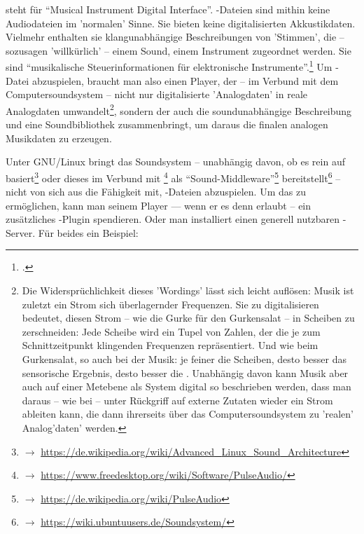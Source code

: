  steht für \enquote{Musical Instrument Digital Interface}.
-Dateien sind mithin keine Audiodateien im 'normalen' Sinne. Sie
bieten keine digitalisierten Akkustikdaten. Vielmehr enthalten sie
klangunabhängige Beschreibungen von 'Stimmen', die -- sozusagen 'willkürlich' --
einem Sound, einem Instrument zugeordnet werden. Sie sind \enquote{musikalische
Steuerinformationen für elektronische Instrumente}.\footcite[vgl. dazu][\nopage
wp]{WpedMidi2019a} Um -Datei abzuspielen, braucht man also einen
Player, der -- im Verbund mit dem Computersoundsystem -- nicht nur
digitalisierte 'Analogdaten' in reale Analogdaten umwandelt\footnote{Die
Widersprüchlichkeit dieses 'Wordings' lässt sich leicht auflösen:
Musik ist zuletzt ein Strom sich überlagernder Frequenzen. Sie zu digitalisieren
bedeutet, diesen Strom -- wie die Gurke für den Gurkensalat -- in Scheiben zu
zerschneiden: Jede Scheibe wird ein Tupel von Zahlen, der die je zum
Schnittzeitpunkt klingenden Frequenzen repräsentiert. Und wie beim Gurkensalat,
so auch bei der Musik: je feiner die Scheiben, desto besser das sensorische
Ergebnis, desto besser die . Unabhängig davon
kann Musik aber auch auf einer Metebene als System digital so beschrieben
werden, dass man daraus -- wie bei  -- unter Rückgriff auf externe
Zutaten wieder ein Strom  ableiten kann, die
dann ihrerseits über das Computersoundsystem zu 'realen' Analog'daten' werden.},
sondern der auch die soundunabhängige Beschreibung und eine Soundbibliothek
zusammenbringt, um daraus die finalen analogen Musikdaten zu erzeugen.

Unter GNU/Linux bringt das Soundsystem -- unabhängig davon, ob es rein auf
 basiert\footnote{$\rightarrow$
\href{https://de.wikipedia.org/wiki/Advanced{\_}Linux{\_}Sound{\_}Architecture}
{https://de.wikipedia.org/wiki/Advanced{\_}Linux{\_}Sound{\_}Architecture}} oder
dieses im Verbund mit \footnote{$\rightarrow$
\href{https://www.freedesktop.org/wiki/Software/PulseAudio/}
{https://www.freedesktop.org/wiki/Software/PulseAudio/}} als
\enquote{Sound-Middleware}\footnote{$\rightarrow$
\href{https://de.wikipedia.org/wiki/PulseAudio}
{https://de.wikipedia.org/wiki/PulseAudio}} bereitstellt\footnote{$\rightarrow$
\href{https://wiki.ubuntuusers.de/Soundsystem/}{https://wiki.ubuntuusers.de/Soundsystem/}}
-- nicht von sich aus die Fähigkeit mit, -Dateien abzuspielen.
Um das zu ermöglichen, kann man seinem Player --- wenn er es denn erlaubt -- ein
zusätzliches -Plugin spendieren. Oder man installiert einen generell
nutzbaren -Server. Für beides ein Beispiel:

